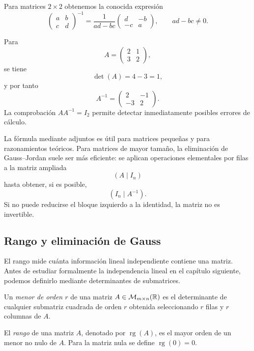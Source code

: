 Para matrices $2\times2$ obtenemos la conocida expresión
\[
\begin{pmatrix}a&b\\c&d\end{pmatrix}^{-1}
=
\frac{1}{ad-bc}
\begin{pmatrix}d&-b\\-c&a\end{pmatrix},
\qquad ad-bc\neq0.
\]

\begin{example}
Para
\[
A=\begin{pmatrix}2&1\\3&2\end{pmatrix},
\]
se tiene
\[
\det(A)=4-3=1,
\]
y por tanto
\[
A^{-1}=\begin{pmatrix}2&-1\\-3&2\end{pmatrix}.
\]
La comprobación $AA^{-1}=I_2$ permite detectar inmediatamente posibles errores de cálculo.
\end{example}

La fórmula mediante adjuntos es útil para matrices pequeñas y para razonamientos teóricos. Para matrices de mayor tamaño, la eliminación de Gauss--Jordan suele ser más eficiente: se aplican operaciones elementales por filas a la matriz ampliada
\[
(A\mid I_n)
\]
hasta obtener, si es posible,
\[
(I_n\mid A^{-1}).
\]
Si no puede reducirse el bloque izquierdo a la identidad, la matriz no es invertible.

\subsection{Rango y eliminación de Gauss}

El rango mide cuánta información lineal independiente contiene una matriz. Antes de estudiar formalmente la independencia lineal en el capítulo siguiente, podemos definirlo mediante determinantes de submatrices.

\begin{definition}
Un \emph{menor de orden $r$} de una matriz $A\in\mathcal M_{m\times n}(\mathbb{R})$ es el determinante de cualquier submatriz cuadrada de orden $r$ obtenida seleccionando $r$ filas y $r$ columnas de $A$.
\end{definition}

\begin{definition}[Rango]
El \emph{rango} de una matriz $A$, denotado por $\operatorname{rg}(A)$, es el mayor orden de un menor no nulo de $A$. Para la matriz nula se define $\operatorname{rg}(0)=0$.
\end{definition}


